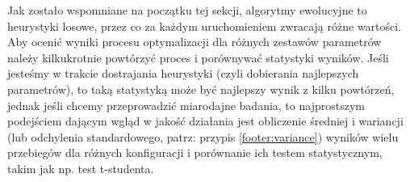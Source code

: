 \documentclass[./FM_mgr.tex]{subfiles}
\begin{document}
Jak zostało wspomniane na początku tej sekcji, algorytmy ewolucyjne to heurystyki losowe, przez co za każdym uruchomieniem zwracają różne wartości. Aby ocenić wyniki procesu optymalizacji dla różnych zestawów parametrów należy kilkukrotnie powtórzyć proces i porównywać statystyki wyników. Jeśli jesteśmy w trakcie dostrajania heurystyki (czyli dobierania najlepszych parametrów), to taką statystyką może być najlepszy wynik z kilku powtórzeń, jednak jeśli chcemy przeprowadzić miarodajne badania, to najprostszym podejściem dającym wgląd w jakość działania jest obliczenie średniej i wariancji (lub odchylenia standardowego, patrz: przypis \ref{footer:variance}) wyników wielu przebiegów dla różnych konfiguracji i porównanie ich testem statystycznym, takim jak np. test t-studenta.
\end{document}
